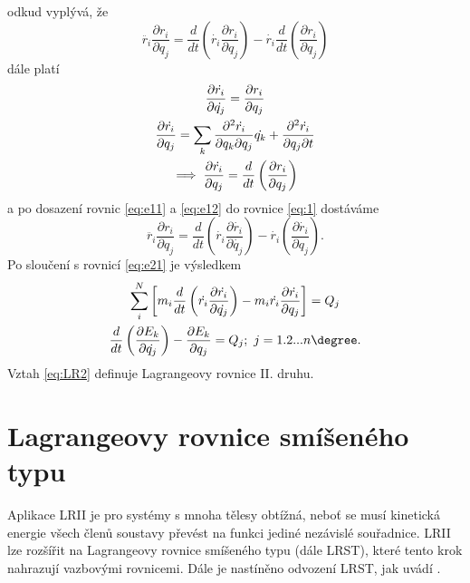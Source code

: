 odkud vyplývá, že
\begin{equation}
	\ddot{r_i}\frac{\partial r_i}{\partial q_j} =
	\frac{d}{dt}\left( \dot{r_i} \frac{\partial r_i}{\partial q_j} \right) - \dot{r_i}\frac{d}{dt}\left( \frac{\partial r_i}{\partial q_j}\right) \label{eq:1}
\end{equation}
dále platí
\begin{gather}
	\frac{\partial \dot{r_i}}{\partial \dot{q_j}}=\frac{\partial r_i}{\partial q_j} \label{eq:e11}\\
	\frac{\partial \dot{r_i}}{\partial {q_j}} = \sum_{k}\frac{\partial^2 \dot{r_i}}{\partial {q_k} \partial {q_j}}  \dot{q_k}+\frac{\partial^2 \dot{r_i}}{ \partial {q_j}\partial t} \notag \\
	\implies \frac{\partial \dot{r_i}}{\partial {q_j}} = \frac{d}{dt}\left( \frac{\partial {r_i}}{\partial {q_j}}  \right) \label{eq:e12}
\end{gather}
a po dosazení rovnic \ref{eq:e11} a \ref{eq:e12} do rovnice \ref{eq:1} dostáváme
\begin{equation}
	\ddot{r_i}\frac{\partial r_i}{\partial q_j} =
	\frac{d}{dt}\left( \dot{r_i} \frac{\partial \dot{r_i}}{\partial \dot{q_j}} \right) - \dot{r_i}\left( \frac{\partial \dot{r_i}}{\partial q_j}\right) \label{eq:2}.
\end{equation}
Po sloučení s rovnicí \ref{eq:e21} je výsledkem
\begin{gather}
	\sum_{i}^{N} \left[ m_i \frac{d}{dt}\left( \dot{r_i} \frac{\partial \dot{r_i}}{\partial \dot{q_j}} \right)  - m_i \dot{r_i}\frac{\partial \dot{r_i}}{\partial q_j}\right] = Q_j \\
	\frac{d}{dt}\left( \frac{\partial E_k}{\partial \dot{q_j}}\right) -\frac{\partial E_k}{\partial {q_j}} = Q_j; \,\, j=1.2...n\degree. \label{eq:LR2}
\end{gather}
Vztah \ref{eq:LR2} definuje Lagrangeovy rovnice II. druhu.

\section{Lagrangeovy rovnice smíšeného typu}\label{sec:LRST}

Aplikace LRII je pro systémy s mnoha tělesy obtížná, neboť se musí kinetická energie všech členů soustavy převést na funkci jediné nezávislé souřadnice. LRII lze rozšířit na Lagrangeovy rovnice smíšeného typu (dále LRST), které tento krok nahrazují vazbovými rovnicemi. Dále je nastíněno odvození LRST, jak uvádí \cite{cite:bible}.

